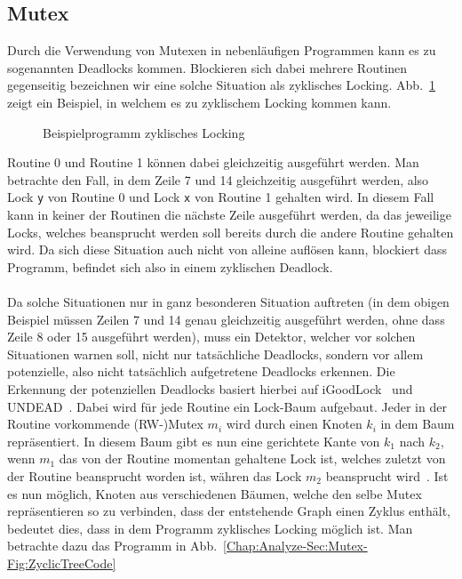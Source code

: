\subsection{Mutex}\label{Chap:Back-Sec:Prob-SubSec:Mutex}
Durch die Verwendung von Mutexen in nebenläufigen Programmen kann es 
zu sogenannten Deadlocks kommen. Blockieren sich dabei mehrere Routinen 
gegenseitig bezeichnen wir eine solche Situation als zyklisches Locking.
Abb.~\ref{Chap:Analyze-Sec:Mutex-Fig:Zyclic} zeigt ein Beispiel, in welchem es zu zyklischem 
Locking kommen kann.
\begin{figure}[h!]
  
  \caption{Beispielprogramm zyklisches Locking}
  \label{Chap:Analyze-Sec:Mutex-Fig:Zyclic}
\end{figure}
Routine 0 und Routine 1 können dabei gleichzeitig ausgeführt werden. Man betrachte den Fall, in dem 
Zeile 7 und 14 gleichzeitig ausgeführt werden, also Lock \texttt{y} von Routine 0 und Lock \texttt{x} 
von Routine 1 gehalten wird. In diesem Fall kann in keiner der Routinen die nächste Zeile ausgeführt werden,
da das jeweilige Locks, welches beansprucht werden soll bereits durch die andere Routine gehalten wird. 
Da sich diese Situation auch nicht von alleine auflösen kann, blockiert dass Programm, befindet sich also 
in einem zyklischen Deadlock.\\\\
Da solche Situationen nur in ganz besonderen Situation auftreten (in dem obigen Beispiel müssen Zeilen 
7 und 14 genau gleichzeitig ausgeführt werden, ohne dass Zeile 8 oder 15 ausgeführt werden), muss 
ein Detektor, welcher vor solchen Situationen warnen soll, nicht nur tatsächliche Deadlocks, sondern
vor allem potenzielle, also nicht tatsächlich aufgetretene Deadlocks erkennen. Die Erkennung der 
potenziellen Deadlocks basiert hierbei auf iGoodLock~\cite{iGoodLock} und UNDEAD~\cite{Undead}. 
Dabei wird für jede Routine ein Lock-Baum aufgebaut. Jeder in der Routine vorkommende 
(RW-)Mutex $m_i$ wird durch einen Knoten $k_i$ in dem Baum repräsentiert. 
In diesem Baum gibt es nun eine gerichtete Kante von $k_1$ nach $k_2$, wenn 
$m_1$ das
von der Routine momentan gehaltene Lock ist, welches zuletzt von der Routine 
beansprucht worden ist, währen das Lock $m_2$ beansprucht wird~\cite{lock-tree}.
Ist es nun möglich, Knoten aus verschiedenen Bäumen, welche den selbe
Mutex repräsentieren so zu verbinden, dass der entstehende Graph einen Zyklus 
enthält, bedeutet dies, dass in dem Programm zyklisches Locking möglich ist. 
Man betrachte dazu das Programm in Abb.~\ref{Chap:Analyze-Sec:Mutex-Fig:ZyclicTreeCode}
